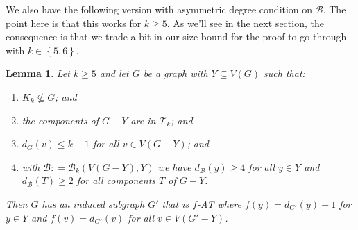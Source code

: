\documentclass[12pt]{article}
\theoremstyle{plain}
\newtheorem{lem}[thm]{Lemma}
\theoremstyle{definition}
\theoremstyle{remark}
\newcommand{\fancy}[1]{\mathcal{#1}}
\newcommand{\T}{\fancy{T}}
\newcommand{\B}{\fancy{B}}
\newcommand{\set}[1]{\left\{ #1 \right\}}
\newcommand{\DefinedAs}{\mathrel{\mathop:}=}
\begin{document}
We also have the following version with asymmetric degree condition on $\B$.  The point here is that this works for $k \ge 5$.  As we'll see in the next section, the consequence is that we trade a bit in our size bound for the proof to go through with $k \in \set{5,6}$.

\begin{lem}
	\label{MultipleHighConfigurationEulerLopsided} Let $k \ge 5$ and let $G$ be a graph with
	$Y\subseteq V(G)$ such that: 
	\begin{enumerate}
		\item $K_{k}\not\subseteq G$; and 
		\item the components of $G-Y$ are in $\T_{k}$; and 
		\item $d_{G}(v)\leq k-1$ for all $v\in V(G-Y)$; and 
		\item with $\B \DefinedAs \B_k(V(G-Y), Y)$ we have $d_{\B}(y) \ge 4$ for all $y \in Y$ and $d_{\B}(T) \ge 2$ for all components $T$ of $G-Y$.
	\end{enumerate}
	\noindent Then $G$ has an induced subgraph $G'$ that is $f$-AT where $f(y)=d_{G'}(y)-1$
	for $y\in Y$ and $f(v)=d_{G'}(v)$ for all $v\in V(G'-Y)$.\end{lem}





\end{document}
